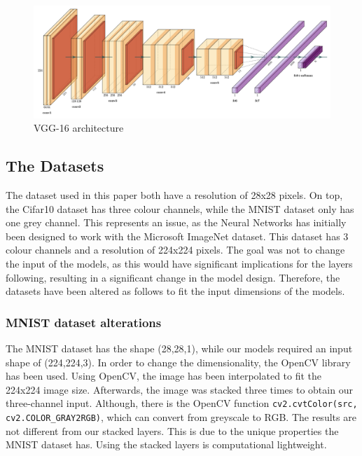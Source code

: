 \documentclass[conference]{IEEEtran}
\begin{document}
\begin{figure}[!htbp]
    \centering
    \includegraphics[scale=0.07]{img/VGG.png}
    \caption{VGG-16 architecture \cite{noauthor_forks_nodate}}
    \label{fig:x VGG architecture}
\end{figure}

\subsection{The Datasets}\label{ID}

The dataset used in this paper both have a resolution of 28x28 pixels. On top, the Cifar10 dataset has three colour channels, while the MNIST dataset only has one grey channel.
This represents an issue, as the Neural Networks has initially been designed to work with the Microsoft ImageNet dataset. This dataset has 3 colour channels and a resolution of 224x224 pixels.
The goal was not to change the input of the models, as this would have significant implications for the layers following, resulting in a significant change in the model design.
Therefore, the datasets have been altered as follows to fit the input dimensions of the models.

\subsubsection{MNIST dataset alterations}
The MNIST dataset has the shape (28,28,1), while our models required an input shape of (224,224,3). 
In order to change the dimensionality, the OpenCV library has been used. Using OpenCV, the image has been interpolated to fit the 224x224 image size. 
Afterwards, the image was stacked three times to obtain our three-channel input. Although, there is the OpenCV function \verb|cv2.cvtColor(src, cv2.COLOR_GRAY2RGB)|, 
which can convert from greyscale to RGB. The results are not different from our stacked layers. 
This is due to the unique properties the MNIST dataset has. Using the stacked layers is computational lightweight.
\end{document}
